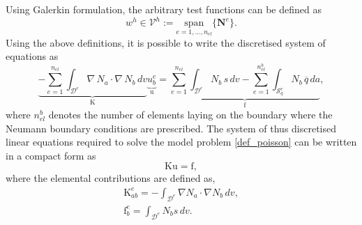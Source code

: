 \documentclass[../main.tex]{subfiles}
\begin{document}
Using Galerkin formulation, the arbitrary test functions can be defined as
\begin{equation}
    w^{h} \in \mathcal{V}^{h} := \underset{{e = 1,...,n_{el}}}{\mathrm{span}}\{\mathbf{N}^{e}\}.
\end{equation}
%
Using the above definitions, it is possible to write the discretised system of equations as 
\begin{equation}\label{discretised_poisson}
    \underbrace{-\sum^{n_{el}}_{e=1} \int_{\mathcal{D}^{e}} \nabla \, N_{a} \cdot \nabla \, N_{b} \, dv}_{\boldsymbol{\mathrm{K}}} \underbrace{u_{b}^{e}}_{\boldsymbol{\mathrm{u}}} = 
    \underbrace{\sum^{n_{el}}_{e=1} \int_{\mathcal{D}^{e}} N_{b}\, s \,dv - \sum^{n^{b}_{el}}_{e=1} \int_{\mathcal{S}^{e}_{q}} N_{b} \,\overline{q} \,da}_{\boldsymbol{\mathrm{f}}}  ,
\end{equation}
where $n^{b}_{el}$ denotes the number of elements laying on the boundary where the Neumann boundary conditions are prescribed. The system of thus discretised linear equations required to solve the
 model problem \eqref{def_poisson} can be written in a compact form as
 \begin{equation}\label{FEM}
    \boldsymbol{\mathrm{Ku}} = \boldsymbol{\mathrm{f}}, 
 \end{equation}
where the elemental contributions are defined as,
\begin{gather}\label{K_and_f}
    \boldsymbol{\mathrm{K}}^{e}_{ab} = -\int_{\mathcal{D}^{e}} \nabla N_a \cdot \nabla N_b \, dv,\\
    \boldsymbol{\mathrm{f}}^{e}_{b} = \int_{\mathcal{D}^{e}} N_b s \,dv.
\end{gather}
\end{document}
